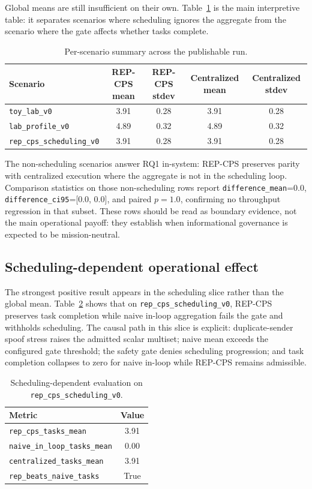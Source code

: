 \documentclass[11pt]{article}
\newcommand{\repcps}{REP-CPS}
\newcommand{\field}[1]{\texttt{#1}}
\newcommand{\code}[1]{\texttt{#1}}
\begin{document}
Global means are still insufficient on their own. Table~\ref{tab:per-scenario} is the main interpretive table: it separates scenarios where scheduling ignores the aggregate from the scenario where the gate affects whether tasks complete.

\begin{table}[H]
\centering
\caption{Per-scenario summary across the publishable run.}
\label{tab:per-scenario}
\begin{tabular}{lcccc}
\toprule
Scenario & REP-CPS mean & REP-CPS stdev & Centralized mean & Centralized stdev \\
\midrule
\code{toy\_lab\_v0} & 3.91 & 0.28 & 3.91 & 0.28 \\
\code{lab\_profile\_v0} & 4.89 & 0.32 & 4.89 & 0.32 \\
\code{rep\_cps\_scheduling\_v0} & 3.91 & 0.28 & 3.91 & 0.28 \\
\bottomrule
\end{tabular}
\end{table}

The non-scheduling scenarios answer RQ1 in-system: \repcps{} preserves parity with centralized execution where the aggregate is not in the scheduling loop. Comparison statistics on those non-scheduling rows report \field{difference\_mean}=0.0, \field{difference\_ci95}=[0.0, 0.0], and paired $p=1.0$, confirming no throughput regression in that subset.
These rows should be read as boundary evidence, not the main operational payoff: they establish when informational governance is expected to be mission-neutral.

\subsection{Scheduling-dependent operational effect}

The strongest positive result appears in the scheduling slice rather than the global mean. Table~\ref{tab:scheduling} shows that on \code{rep\_cps\_scheduling\_v0}, \repcps{} preserves task completion while naive in-loop aggregation fails the gate and withholds scheduling.
The causal path in this slice is explicit: duplicate-sender spoof stress raises the admitted scalar multiset; naive mean exceeds the configured gate threshold; the safety gate denies scheduling progression; and task completion collapses to zero for naive in-loop while \repcps{} remains admissible.

\begin{table}[H]
\centering
\caption{Scheduling-dependent evaluation on \code{rep\_cps\_scheduling\_v0}.}
\label{tab:scheduling}
\begin{tabular}{lc}
\toprule
Metric & Value \\
\midrule
\field{rep\_cps\_tasks\_mean} & 3.91 \\
\field{naive\_in\_loop\_tasks\_mean} & 0.00 \\
\field{centralized\_tasks\_mean} & 3.91 \\
\field{rep\_beats\_naive\_tasks} & True \\
\bottomrule
\end{tabular}
\end{table}
\end{document}
